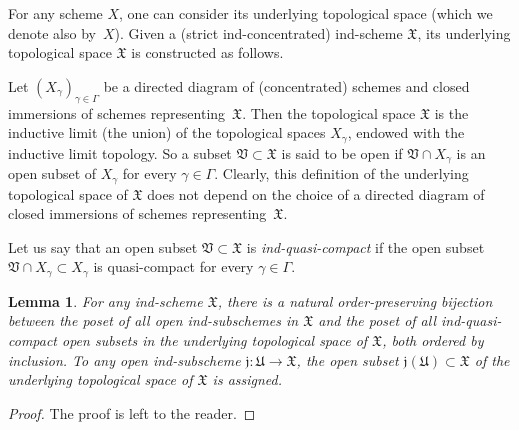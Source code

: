 \documentclass[12pt,a4paper]{amsart}
\newcommand{\+}{\protect\nobreakdash-}
\renewcommand{\:}{\colon}
\newcommand{\rarrow}{\longrightarrow}
\newcommand{\fX}{\mathfrak X}
\newcommand{\fU}{\mathfrak U}
\newcommand{\fV}{\mathfrak V}
\newcommand{\fj}{\mathfrak j}
\theoremstyle{plain}
\newtheorem{lem}[thm]{Lemma}
\theoremstyle{definition}
\begin{document}
 For any scheme $X$, one can consider its underlying topological space
(which we denote also by~$X$).
 Given a (strict ind-concentrated) ind-scheme $\fX$, its underlying
topological space $\fX$ is constructed as follows.

 Let $(X_\gamma)_{\gamma\in\Gamma}$ be a directed diagram of
(concentrated) schemes and closed immersions of schemes
representing~$\fX$.
 Then the topological space $\fX$ is the inductive limit (the union)
of the topological spaces $X_\gamma$, endowed with the inductive
limit topology.
 So a subset $\fV\subset\fX$ is said to be open if $\fV\cap X_\gamma$
is an open subset of $X_\gamma$ for every $\gamma\in\Gamma$.
 Clearly, this definition of the underlying topological space of $\fX$
does not depend on the choice of a directed diagram of closed
immersions of schemes representing~$\fX$.

 Let us say that an open subset $\fV\subset\fX$ is
\emph{ind-quasi-compact} if the open subset $\fV\cap X_\gamma
\subset X_\gamma$ is quasi-compact for every $\gamma\in\Gamma$.

\begin{lem} \label{open-ind-subschemes=qc-open-subsets}
 For any ind-scheme\/ $\fX$, there is a natural order-preserving
bijection between the poset of all open ind-subschemes in\/ $\fX$
and the poset of all ind-quasi-compact open subsets in the underlying
topological space of\/ $\fX$, both ordered by inclusion.
 To any open ind-subscheme\/ $\fj\:\fU\rarrow\fX$, the open subset\/
$\fj(\fU)\subset\fX$ of the underlying topological space of\/ $\fX$
is assigned.
\end{lem}

\begin{proof}
 The proof is left to the reader.
\end{proof}
\end{document}
